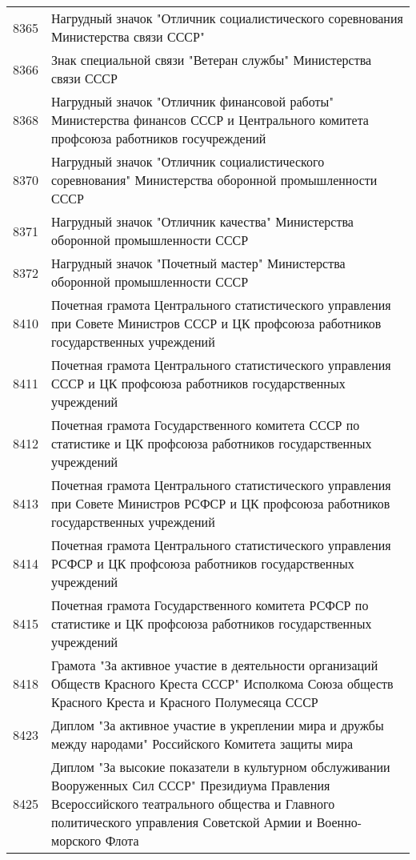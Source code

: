 \documentclass[10pt, a4paper, titlepage]{article}
\begin{document}
\begin{center}
\begin{longtable}{rp{}}
        8365 & Нагрудный значок "Отличник социалистического соревнования Министерства связи СССР" \\
        8366 & Знак специальной связи "Ветеран службы" Министерства связи СССР \\
        8368 & Нагрудный значок "Отличник финансовой работы" Министерства финансов СССР и Центрального комитета профсоюза работников госучреждений \\
        8370 & Нагрудный значок "Отличник социалистического соревнования" Министерства оборонной промышленности СССР \\
        8371 & Нагрудный значок "Отличник качества" Министерства оборонной промышленности СССР \\
        8372 & Нагрудный значок "Почетный мастер" Министерства оборонной промышленности СССР \\
        8410 & Почетная грамота Центрального статистического управления при Совете Министров СССР и ЦК профсоюза работников государственных учреждений \\
        8411 & Почетная грамота Центрального статистического управления СССР и ЦК профсоюза работников государственных учреждений \\
        8412 & Почетная грамота Государственного комитета СССР по статистике и ЦК профсоюза работников государственных учреждений \\
        8413 & Почетная грамота Центрального статистического управления при Совете Министров РСФСР и ЦК профсоюза работников государственных учреждений \\
        8414 & Почетная грамота Центрального статистического управления РСФСР и ЦК профсоюза работников государственных учреждений \\
        8415 & Почетная грамота Государственного комитета РСФСР по статистике и ЦК профсоюза работников государственных учреждений \\
        8418 & Грамота "За активное участие в деятельности организаций Обществ Красного Креста СССР" Исполкома Союза обществ Красного Креста и Красного Полумесяца СССР \\
        8423 & Диплом "За активное участие в укреплении мира и дружбы между народами" Российского Комитета защиты мира \\
        8425 & Диплом "За высокие показатели в культурном обслуживании Вооруженных Сил СССР" Президиума Правления Всероссийского театрального общества и Главного политического управления Советской Армии и Военно-морского Флота \\

\end{longtable}
\end{center}
\end{document}
